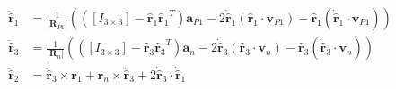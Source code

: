 \documentclass[]{AVSSimReportMemo}
\begin{document}
\begin{subequations}
	\begin{align}
		\ddot{\hat{\bm{r}}}_1 &= \frac{1}{|{\bm R}_{P1}|}
		(
		([I_{3\times3}] - {\hat{\bm{r}}_1}{\hat{\bm{r}}_1}^T)  \bm{a}_{P1} -
		2\dot{\hat{\bm{r}}}_1 (\hat{\bm{r}}_1 \cdot \bm{v}_{P1}) -
		\hat{\bm{r}}_1 (\dot{\hat{\bm{r}}}_1 \cdot \bm{v}_{P1})
		) \\
		\ddot{\hat{\bm{r}}}_3 &= \frac{1}{|{\bm R}_{n}|}
		(
		([I_{3\times3}] - {\hat{\bm{r}}_3}{\hat{\bm{r}}_3}^T)  \bm{a}_{n} -
		2\dot{\hat{\bm{r}}}_3 (\hat{\bm{r}}_3 \cdot \bm{v}_{n}) -
		\hat{\bm{r}}_3 (\dot{\hat{\bm{r}}}_3 \cdot \bm{v}_{n})
		) \\
		\ddot{\hat{\bm{r}}}_2 &= \ddot{\hat{\bm{r}}}_3 \times \bm{r}_1 +  \bm{r}_n  \times \ddot{\hat{\bm{r}}}_3 + 2\dot{\hat{\bm{r}}}_3 \cdot \dot{\hat{\bm{r}}}_1
	\end{align}
\end{subequations}
\end{document}
